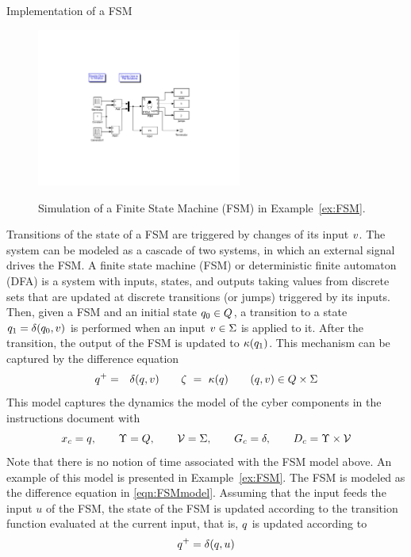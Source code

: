 \begin{example}{Implementation of a FSM}\label{ex:FSM}

\begin{figure}
  \begin{center}
    {\includegraphics[width=0.6\textwidth]{figures/Simulink/FSM_example.pdf}}
   \caption{Simulation of a Finite State Machine (FSM) in Example~\ref{ex:FSM}.}
\label{fig:FSM_example}
  \end{center}
\end{figure}

Transitions of the state of a FSM are triggered by changes of its input $v$.
The system can be modeled as a cascade of two systems,
in which an external signal drives the FSM. 
\IfSAE
{
A finite state machine (FSM) or deterministic finite automaton (DFA) is a system with
inputs, states, and outputs taking values from discrete sets that are updated at discrete transitions (or jumps)
triggered by its inputs. 
Then, given a FSM and an initial state $q_0 \in Q$,  
a transition to a state $q_1 = \delta(q_0,v)$ is performed
when an input $v \in \Sigma$ is applied to it.
After the transition, the output of the FSM is updated to $\kappa(q_1)$.
This mechanism can be captured by the difference equation
\begin{eqnarray}\label{eqn:FSMmodel}
\xlogic^+ & = & \delta(\xlogic,\uc)  \qquad \yc \ = \ \hc(\xlogic) \qquad (\xlogic,\uc)  \in \xlogicSpace \times \Sigma
\end{eqnarray}
This model captures the dynamics
the model of the cyber components 
in the instructions document
with
$$
x_c = q, \qquad \Upsilon = Q, \qquad {\cal V} = \Sigma, \qquad G_c = \delta, \qquad D_c = \Upsilon\times{\cal V}
$$
Note that there is no notion of time associated with the FSM model above. An example of this model is presented in Example~\ref{ex:FSM}. 
}
{The FSM is modeled as the difference equation in \eqref{eqn:FSMmodel}.}
Assuming that the input feeds the input $u$ of the FSM, 
the state of the FSM is updated according to the transition function evaluated at the current input, that is,
$q$ is updated according to
 $$
q^+  =  \delta(q,u)
$$


\end{example}
